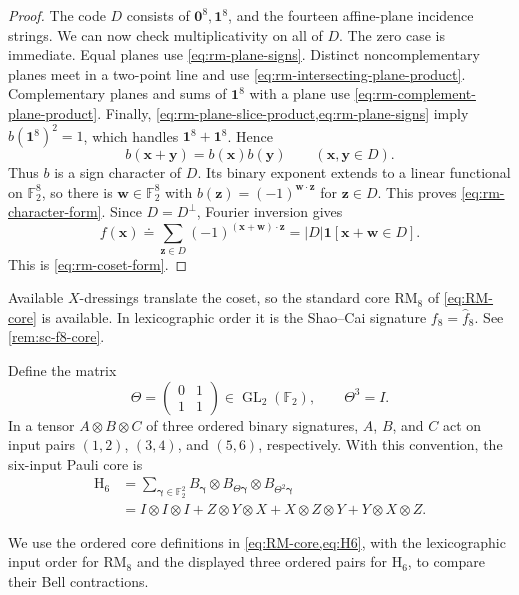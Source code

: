 \documentclass[11pt,letterpaper,onecolumn]{article}
\theoremstyle{plain}
\theoremstyle{definition}
\theoremstyle{remark}
\newcommand{\Ftwo}{\mathbb F_2}
\newcommand{\GL}{\operatorname{GL}}
\newcommand{\one}{\mathbf 1}
\newcommand{\zero}{\mathbf 0}
\newcommand{\RMcore}{\mathrm{RM}_8}
\newcommand{\Hcore}{\mathrm{H}_6}
\begin{document}
\begin{proof}
The code \(D\) consists of \(\zero^8,\one^8\), and the fourteen affine-plane
incidence strings.  We can now check multiplicativity on all of \(D\).
The zero case is immediate.  Equal planes use
\cref{eq:rm-plane-signs}. Distinct noncomplementary planes meet in a
two-point line and use \cref{eq:rm-intersecting-plane-product}.
Complementary planes and sums of \(\one^8\) with a plane use
\cref{eq:rm-complement-plane-product}.  Finally,
\cref{eq:rm-plane-slice-product,eq:rm-plane-signs} imply
\(b(\one^8)^2=1\), which handles \(\one^8+\one^8\).  Hence
\[
 b({\mathbf{x}}+{\mathbf{y}})=b({\mathbf{x}})b({\mathbf{y}})
 \qquad({\mathbf{x}},{\mathbf{y}}\in D).
\]
Thus \(b\) is a sign character of \(D\).  Its binary exponent extends to a
linear functional on \(\Ftwo^8\), so there is \({\mathbf{w}}\in\Ftwo^8\) with
\(b({\mathbf{z}})=(-1)^{{\mathbf{w}}\cdot {\mathbf{z}}}\) for \({\mathbf{z}}\in D\).  This proves
\cref{eq:rm-character-form}.  Since \(D=D^\perp\), Fourier inversion gives
\[
  f({\mathbf{x}})\doteq\sum_{{\mathbf{z}}\in D}(-1)^{({\mathbf{x}}+{\mathbf{w}})\cdot {\mathbf{z}}}
  =|D|\one[{\mathbf{x}}+{\mathbf{w}}\in D].
\]
This is \cref{eq:rm-coset-form}.
\end{proof}

Available \(X\)-dressings translate the coset, so the standard core
\(\RMcore\) of \cref{eq:RM-core} is available.  In lexicographic order it is the
Shao--Cai signature \(f_8=\widehat f_8\). See \cref{rem:sc-f8-core}.

Define the matrix
\[
  \Theta=
  \begin{pmatrix}0&1\\1&1\end{pmatrix}
  \in\GL_2(\Ftwo),
  \qquad \Theta^3=I.
\]
In a tensor \(A\otimes B\otimes C\) of three ordered binary signatures,
\(A\), \(B\), and \(C\) act on input pairs \((1,2)\), \((3,4)\), and
\((5,6)\), respectively.  With this convention, the six-input Pauli core is
\begin{equation}
  \begin{aligned}
    \Hcore
    &=\sum_{{\boldsymbol{\gamma}}\in\Ftwo^2}
      B_{\boldsymbol{\gamma}}\otimes B_{\Theta{\boldsymbol{\gamma}}}\otimes B_{\Theta^2{\boldsymbol{\gamma}}}\\
    &=I\otimes I\otimes I
      +Z\otimes Y\otimes X
      +X\otimes Z\otimes Y
      +Y\otimes X\otimes Z.
  \end{aligned}
  \label{eq:H6}
\end{equation}

We use the ordered core definitions in \cref{eq:RM-core,eq:H6}, with
the lexicographic input order for \(\RMcore\) and the displayed three
ordered pairs for \(\Hcore\), to compare their Bell contractions.
\end{document}
